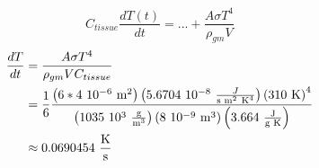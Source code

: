 \clearpage
\begin{equation}
  C_{tissue} \frac{dT(t)}{dt} = ... +\frac{A \sigma T^4}{\rho_{gm} V}
\end{equation}
\begin{align}
  \frac{dT}{dt} &= \frac{A \sigma T^{4}}{\rho_{gm} V C_{tissue}}\nonumber\\
  & {} = \frac{1}{6}%
  \frac{%
    \left(6*4\ 10^{-6}\ \text{m}^{2}\right)%
    \left(5.6704\ 10^{-8}\ \frac{J}{\text{s m}^{2}\ \text{K}^{4}}\right)%
    \left(310\ \text{K}\right)^{4}}%
  { \left(1035\ 10^3\ \frac{\text{g}}{\text{m}^{3}}\right)%
    \left(8\ 10^{-9}\ \text{m}^3\right)%
    \left(3.664\ \frac{\text{J}}{\text{g K}}\right)}\nonumber\\
  & {} \approx 0.0690454\ \frac{\text{K}}{\text{s}}
\end{align}